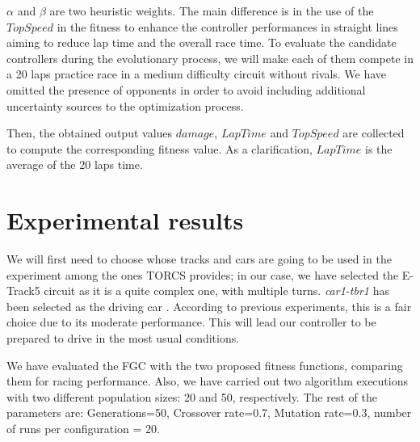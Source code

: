 \documentclass[conference]{IEEEtran}
\begin{document}
$\alpha$ and $\beta$ are two heuristic weights. The main difference is
in the use of the $TopSpeed$ in the fitness to enhance the controller performances in straight lines aiming to reduce lap time and the overall race time.
To evaluate the candidate controllers during the evolutionary process, we will make each of them compete in a 20 laps practice race in a medium difficulty circuit without rivals. We have omitted the presence of opponents in order to avoid including additional uncertainty sources to the optimization process.

Then, the obtained output values $damage$, $LapTime$ and $TopSpeed$ are collected to compute the corresponding fitness value. As a clarification, $LapTime$ is the average of the 20 laps time.



\section{Experimental results}  
\label{sec:results}


We will first need to choose whose tracks and cars are going to be used in the
experiment among the ones TORCS provides; in our case, we have selected the E-Track5 circuit as it is a
quite complex one, with multiple turns. \textit{car1-tbr1} has been
selected as the driving car \cite{evo17}. According to previous
experiments, this is a fair choice due to its moderate
performance. This will lead our controller to be prepared to drive in the most usual conditions. 

We have evaluated the FGC with the two proposed fitness functions, %
comparing them for racing performance. Also, we have  carried out two algorithm executions with two different population sizes: 20 and 50, respectively. The rest of the parameters are: Generations=50, Crossover rate=0.7, Mutation rate=0.3, number of runs per configuration = 20.
\end{document}

